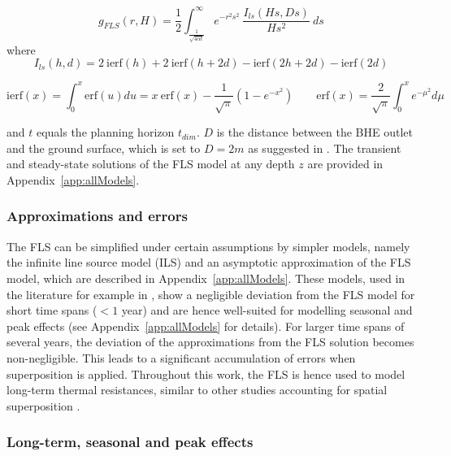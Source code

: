 \begin{equation}
\label{eq:FLS_int}
     g_{FLS}(r, H) = \frac{1}{2} \int_{\frac{1}{\sqrt{4 \alpha t}}}^{\infty}  e^{- r^2 s^2} \ \frac{I_{ls}(Hs, Ds)}{H s^2} \ ds
\end{equation}
where
\begin{equation*}
    I_{ls}(h, d) = 2\ \mathrm{ierf}(h) + 2\ \mathrm{ierf}(h + 2d) - \mathrm{ierf}(2h + 2d) - \mathrm{ierf}(2d)
\end{equation*}

\begin{equation*}
    \mathrm{ierf}(x) = \int_0^x \mathrm{erf}(u) du 
                     = x \ \mathrm{erf}(x) - \frac{1}{\sqrt{\pi}} (1 - e^{-x^2})
    \qquad
    \mathrm{erf}(x) = \frac{2}{\sqrt{\pi}} \int_0^x e^{-\mu^2} d \mu 
\end{equation*}

and $t$ equals the planning horizon $t_\mathit{dim}$. $D$ is the distance between the BHE outlet and the ground surface, which is set to $D = 2m$ as suggested in \cite{pahud_geothermal_2002}. The transient and steady-state solutions of the FLS model at any depth $z$ are provided in Appendix~\ref{app:allModels}.

\subsubsection{Approximations and errors}

The FLS can be simplified under certain assumptions by simpler models, namely the infinite line source model (ILS) and an asymptotic approximation of the FLS model, which are described in Appendix~\ref{app:allModels}.
These models, used in the literature for example in \cite{alcaraz_advection_2016,alcaraz_t-i-ger_2017,casasso_g.pot:_2016,bayer_strategic_2014}, show a negligible deviation from the FLS model for short time spans ($< 1$ year) and are hence well-suited for modelling seasonal and peak effects (see Appendix~\ref{app:allModels} for details).
%
For larger time spans of several years, the deviation of the approximations from the FLS solution becomes non-negligible.
This leads to a significant accumulation of errors when superposition is applied.
Throughout this work, the FLS is hence used to model long-term thermal resistances, similar to other studies accounting for spatial superposition \cite{miglani_methodology_2018,rivera_increased_2017}.

\subsubsection{Long-term, seasonal and peak effects}
\label{seas_peak}

